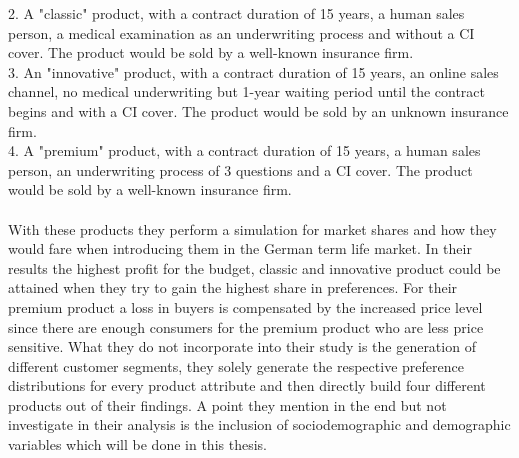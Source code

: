 \documentclass[12pt, abstracton]{article}
\begin{document}
2. A "classic" product, with a contract duration of 15 years, a human sales person, a medical examination as an underwriting process and without a CI cover. The product would be sold by a well-known insurance firm.\\
3. An "innovative" product, with a contract duration of 15 years, an online sales channel, no medical underwriting but 1-year waiting period until the contract begins and with a CI cover. The product would be sold by an unknown insurance firm.\\
4. A "premium" product, with a contract duration of 15 years, a human sales person, an underwriting process of 3 questions and  a CI cover. The product would be sold by a well-known insurance firm.\\\\
With these products they perform a simulation for market shares and how they would fare when introducing them in the German term life market. In their results the highest profit for the budget, classic and innovative product could be attained when they try to gain the highest share in preferences. For their premium product a loss in buyers is compensated by the increased price level since there are enough consumers for the premium product who are less price sensitive. What they do not incorporate into their study is the generation of different customer segments, they solely generate the respective preference distributions for every product attribute and then directly build four different products out of their findings. A point they mention in the end but not investigate in their analysis is the inclusion of sociodemographic and demographic variables which will be done in this thesis.\\
\end{document}

